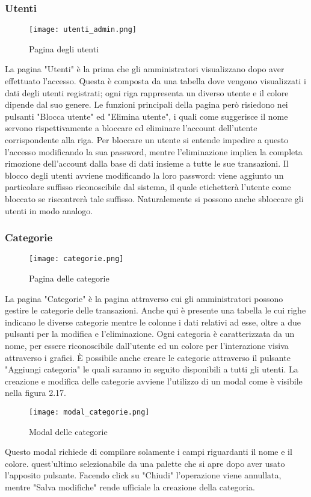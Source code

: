 \documentclass[binding=0.6cm, oneside, noexaminfo, italian]{sapthesis}
\begin{document}
\subsubsection{Utenti}
\begin{figure}[h]
    \centering
    \texttt{[image: utenti\_admin.png]}
    \caption{Pagina degli utenti}
    \label{fig:utenti_admin}
\end{figure}
La pagina "Utenti" è la prima che gli amministratori visualizzano dopo aver effettuato l'accesso. Questa è composta da una tabella dove vengono visualizzati i dati degli utenti registrati; ogni riga rappresenta un diverso utente e il colore dipende dal suo genere. Le funzioni principali della pagina però risiedono nei pulsanti "Blocca utente" ed "Elimina utente", i quali come suggerisce il nome servono rispettivamente a bloccare ed eliminare l'account dell'utente corrispondente alla riga. Per bloccare un utente si entende impedire a questo l'accesso modificando la sua password, mentre l'eliminazione implica la completa rimozione dell'account dalla base di dati insieme a tutte le sue transazioni. Il blocco degli utenti avviene modificando la loro password: viene aggiunto un particolare suffisso riconoscibile dal sistema, il quale etichetterà l'utente come bloccato se riscontrerà tale suffisso. Naturalemente si possono anche sbloccare gli utenti in modo analogo.
\subsubsection{Categorie}
\begin{figure}[h]
    \centering
    \texttt{[image: categorie.png]}
    \caption{Pagina delle categorie}
    \label{fig:categorie}
\end{figure}
La pagina "Categorie" è la pagina attraverso cui gli amministratori possono gestire le categorie delle transazioni. Anche qui è presente una tabella le cui righe indicano le diverse categorie mentre le colonne i dati relativi ad esse, oltre a due pulsanti per la modifica e l'eliminazione. Ogni categoria è caratterizzata da un nome, per essere riconoscibile dall'utente ed un colore per l'interazione visiva attraverso i grafici. \MakeUppercase{è} possibile anche creare le categorie attraverso il pulsante "Aggiungi categoria" le quali saranno in seguito disponibili a tutti gli utenti. La creazione e modifica delle categorie avviene l'utilizzo di un modal come è visibile nella figura 2.17.
\newpage
\begin{figure}[h]
    \centering
    \texttt{[image: modal\_categorie.png]}
    \caption{Modal delle categorie}
    \label{fig:modal_categorie}
\end{figure}
Questo modal richiede di compilare solamente i campi riguardanti il nome e il colore. quest'ultimo selezionabile da una palette che si apre dopo aver usato l'apposito pulsante. Facendo click su "Chiudi" l'operazione viene annullata, mentre "Salva modifiche" rende ufficiale la creazione della categoria.
\end{document}
